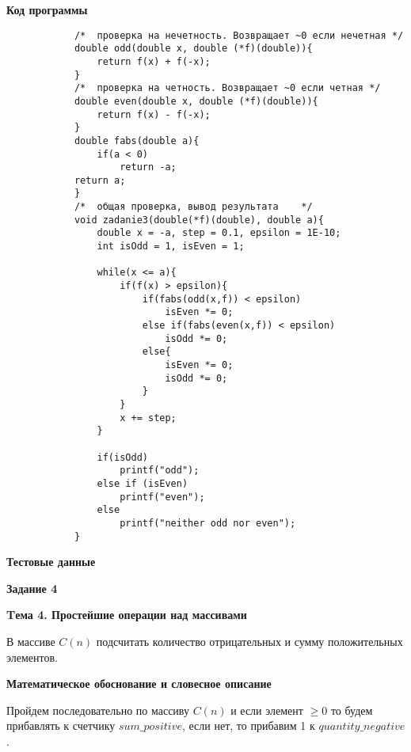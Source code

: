 \documentclass[12pt, a4paper]{article}
\begin{document}
\begin{flushleft}
{\begin{flushleft}
\begin{tikzpicture}
				
				\end{tikzpicture}
			\end{flushleft}
		}
	\newpage
		{\textbf{Код программы}}\par
		\begin{verbatim}
			/*  проверка на нечетность. Возвращает ~0 если нечетная */
			double odd(double x, double (*f)(double)){
    			return f(x) + f(-x);
			}
			/*  проверка на четность. Возвращает ~0 если четная */
			double even(double x, double (*f)(double)){
    			return f(x) - f(-x);
			}
			double fabs(double a){
   				if(a < 0)
        			return -a;
   			return a;
			}
			/*  общая проверка, вывод результата    */
			void zadanie3(double(*f)(double), double a){
				double x = -a, step = 0.1, epsilon = 1E-10;
				int isOdd = 1, isEven = 1;

				while(x <= a){
					if(f(x) > epsilon){
						if(fabs(odd(x,f)) < epsilon)
							isEven *= 0;
						else if(fabs(even(x,f)) < epsilon)
							isOdd *= 0;
						else{
							isEven *= 0;
							isOdd *= 0;
						}
					}
					x += step;
				}

				if(isOdd)
					printf("odd");
				else if (isEven)
					printf("even");
				else
					printf("neither odd nor even");
			}
		\end{verbatim}

		{\textbf{Тестовые данные}\par

		}

	\end{flushleft}

	\begin{flushleft}
		\newpage
		{\textbf{Задание 4}}\par
		{\textbf{Tема 4. Простейшие операции над массивами}}\par
		{В массиве $C(n)$ подсчитать количество отрицательных и сумму
		положительных элементов.}\par
		{\textbf{Математическое обоснование и словесное описание}\par
		Пройдем последовательно по массиву $C(n)$ и если элемент $\geq 0$
		то будем прибавлять к счетчику $sum\_positive$, если нет, то прибавим 1 к
		$quantity\_negative$.
		}\par
	\end{flushleft}
\end{document}
